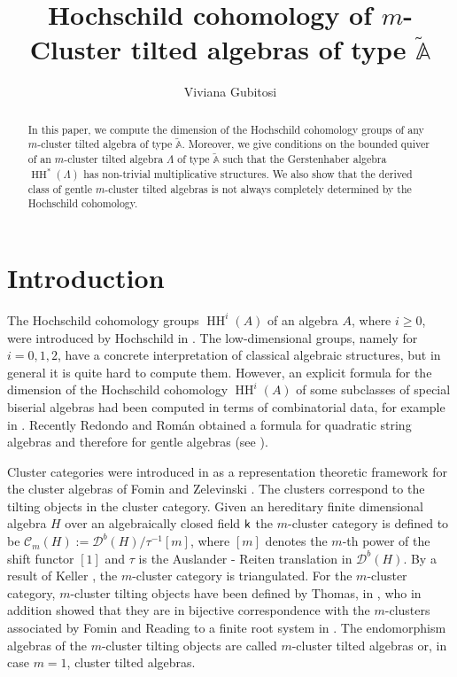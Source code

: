 \documentclass{amsart}
\title[ Hochschild cohomology of  $m$-branched algebras]{Hochschild cohomology of $m$-Cluster tilted algebras of type $\widetilde{\mathbb{A}}$}
\author[V. Gubitosi]{Viviana Gubitosi}
\theoremstyle{plain}
\theoremstyle{definition}
\begin{document}
\maketitle

\begin{abstract}
 In this paper, we compute the dimension of the Hochschild cohomology groups of any $m$-cluster tilted algebra of type $\tilde{\mathbb{A}}$. Moreover, we give conditions on the bounded quiver of an $m$-cluster tilted algebra $\Lambda$ of type $\tilde{\mathbb{A}}$ such that the Gerstenhaber algebra $\operatorname{HH}^*(\Lambda)$ has non-trivial multiplicative structures. We also show that the derived class of gentle $m$-cluster tilted algebras is not always completely determined by the Hochschild cohomology.
\end{abstract}

\section*{Introduction}

The Hochschild cohomology groups $\operatorname{HH}^{i}(A)$ of an algebra $A$, where $i\geq 0$, were introduced by Hochschild in \cite{Ho46}. The
low-dimensional groups, namely for $i=0,1,2$, have a concrete interpretation of classical algebraic structures, but in general it is quite hard to compute
them. However, an explicit formula for the dimension of the Hochschild cohomology $\operatorname{HH}^{i}(A)$ of some subclasses of
special biserial algebras had been computed in terms of combinatorial data, for example in \cite{B06,ST10,Lad12b}. Recently Redondo and
Rom\'an obtained a formula for quadratic string algebras and therefore for gentle algebras (see \cite{RR15}).

Cluster categories were introduced in \cite{Buan2006} as a representation theoretic framework for the  cluster algebras of Fomin and Zelevinski \cite{FZ02}. The clusters correspond to the tilting objects in the cluster category.
Given an hereditary finite dimensional algebra $H$  over  an algebraically closed field ${{\normalfont{\textsf{k}}}}$ the $m$-cluster category is defined to be $\mathcal{C}_m(H):=\mathcal{D}^b(H)/ \tau^{-1} [m]$, where $[m]$  denotes the $m$-th power of  the shift functor $[1]$ and $\tau$ is the Auslander - Reiten translation in $\mathcal{D}^b(H)$. By a result of Keller \cite{K05}, the $m$-cluster category is triangulated.  For the  $m$-cluster category,  $m$-cluster tilting objects have been defined by Thomas, in \cite{Thomas2007}, who in addition showed that they are in bijective correspondence with the $m$-clusters associated by  Fomin and Reading to a finite root system in \cite{FR05}. The endomorphism algebras of the $m$-cluster tilting objects are called $m$-cluster tilted algebras or, in case $m=1$, cluster tilted algebras.
\end{document}
